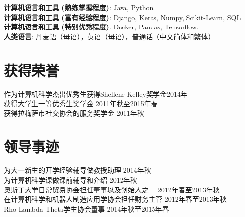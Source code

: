 \documentclass[margin]{res}
\begin{document}
\begin{resume}
\textbf{计算机语言和工具 (熟练掌握程度)}: \href{https://www.lucaskjaerozhang.com/tags/java/}{Java}, \href{https://www.lucaskjaerozhang.com/tags/python/}{Python}.
\\
\textbf{计算机语言和工具 (富有经验程度)}: \href{https://www.lucaskjaerozhang.com/tags/django/}{Django}, \href{https://www.lucaskjaerozhang.com/tags/keras/}{Keras}, \href{https://www.lucaskjaerozhang.com/tags/numpy/}{Numpy}, \href{https://www.lucaskjaerozhang.com/tags/sklearn/}{Scikit-Learn}, \href{https://www.lucaskjaerozhang.com/tags/postgresql/}{SQL}
\\
\textbf{计算机语言和工具 (特别优秀程度)}: \href{https://www.lucaskjaerozhang.com/tags/docker/}{Docker}, \href{https://www.lucaskjaerozhang.com/tags/pandas/}{Pandas}, \href{https://www.lucaskjaerozhang.com/tags/tensorflow/}{Tensorflow}.
\\
\textbf{人类语言}: 丹麦语（母语），\href{https://www.lucaskjaerozhang.com/lucas-kjaero-zhang-resume.pdf}{英语（母语）}，普通话（中文简体和繁体）


\section{获得荣誉}
作为计算机科学杰出优秀生获得Shellene Kelley奖学金\hfill 2014年\\
获得大学生一等优秀生奖学金 \hfill 2011年秋至2015年春\\
获得拉梅萨市社交协会的服务奖学金 \hfill 2011年秋

\section{领导事迹}
为大一新生的开学经验辅导做教授助理 \hfill 2014年秋\\
为计算机科学课做课前辅导和介绍 \hfill 2012年秋\\
奥斯丁大学日常贸易协会担任董事以及创始人之一 \hfill 2012年春至2013年秋\\
在计算机科学和机器人制造应用学协会担任财务主管 \hfill 2012年春至2013年秋\\
Rho Lambda Theta学生协会董事 \hfill 2014年秋至2015年春

\end{resume}
\clearpage
\end{document}
